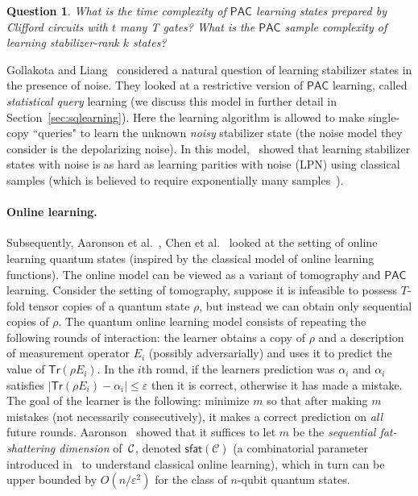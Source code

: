 \documentclass[11pt]{article}
\newcommand{\Cc}{\ensuremath{\mathcal{C}}}
\newcommand{\sfat}{\ensuremath{\mathsf{sfat}}}
\newcommand{\PAC}{\ensuremath{\mathsf{PAC}}}
\newcommand{\Tr}{\textsf{Tr}}
\newcommand{\calC}{{\cal C }}
\newtheorem{question}{Question}
\begin{document}
\begin{question}
What is the time complexity of $\PAC$ learning states prepared by Clifford circuits with $t$ many T gates? What is the $\PAC$ sample complexity of learning stabilizer-rank $k$ states?
\end{question}
 Gollakota and  Liang~\cite{gollakota2022hardness} considered a natural question of learning stabilizer states in the presence of noise. They looked at a restrictive version of $\PAC$ learning, called \emph{statistical query} learning (we discuss this model in further detail in Section~\ref{sec:sqlearning}). Here the learning algorithm is allowed to make single-copy ``queries" to  learn the unknown \emph{noisy} stabilizer state (the noise model they consider is the depolarizing noise). In this model,~\cite{gollakota2022hardness} showed that learning stabilizer states with noise is as hard as learning parities with noise (LPN) using classical samples (which is believed to require exponentially many samples~\cite{blum2003noise}). 


\paragraph{Online learning.} Subsequently, Aaronson et al.~\cite{aaronson2018online}, Chen et al.~\cite{chen2022adaptive}  looked at the setting of online learning quantum states (inspired by the classical model of online learning  functions). The online model can be viewed as a variant of tomography and $\PAC$ learning. Consider the setting of tomography, suppose it is infeasible to possess $T$-fold tensor copies of a quantum state $\rho$, but instead we can obtain only sequential copies of $\rho$. The quantum online learning model consists of repeating the following rounds of interaction: the learner obtains a copy of $\rho$ and a description of measurement operator $E_i$ (possibly adversarially) and uses it to predict the value of $\Tr(\rho E_i)$. In the $i$th round, if the learners prediction was $\alpha_i$ and $\alpha_i$ satisfies $|\Tr(\rho E_i)- \alpha_i|\leq \varepsilon$ then it is correct, otherwise it has made a mistake. The goal of the learner is the following: minimize $m$ so that after making $m$ mistakes (not necessarily consecutively), it makes a correct prediction on \emph{all} future rounds. Aaronson~\cite{aaronson2018online} showed that it suffices to let $m$ be 
  the \emph{sequential fat-shattering dimension} of~$\calC$, denoted $\sfat(\Cc)$ (a combinatorial parameter  introduced in~\cite{rakhlin2015online} to understand classical online learning), which in turn can be upper bounded by $O(n/\varepsilon^2)$ for the class of $n$-qubit quantum states.
\end{document}

